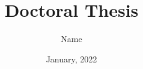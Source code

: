 %
%
%
 



 





\title{Doctoral Thesis}
\author{Name}
\date{January, 2022}







%

%
%




\appendix


%
%
%
%




